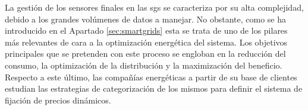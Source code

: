 \vspace{3mm}



La gestión de los sensores finales en las \gls{sg}s se caracteriza por su alta complejidad, debido a los grandes volúmenes de datos a manejar. No obstante, como se ha introducido en el Apartado \ref{sec:smartgrids} esta se trata de uno de los pilares más relevantes de cara a la optimización energética del sistema. Los objetivos principales que se pretenden con este proceso se engloban en la reducción del consumo, la optimización de la distribución y la maximización del beneficio. Respecto a este último, las compañías energéticas a partir de su base de clientes estudian las estrategias de categorización de los mismos para definir el sistema de fijación de precios dinámicos. 

